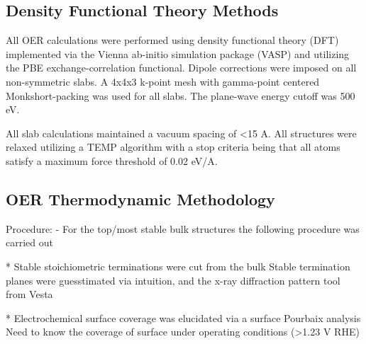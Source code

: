 \subsection{Density Functional Theory Methods}  %
%
All OER calculations were performed using density functional theory (DFT) implemented via the Vienna ab-initio simulation package (VASP) and utilizing the PBE exchange-correlation functional.
Dipole corrections were imposed on all non-symmetric slabs.
A 4x4x3 k-point mesh with gamma-point centered Monkshort-packing was used for all slabs.
The plane-wave energy cutoff was 500 eV.


All slab calculations maintained a vacuum spacing of <15 A.
All structures were relaxed utilizing a TEMP algorithm with a stop criteria being that all atoms satisfy a maximum force threshold of 0.02 eV/A.



\subsection{OER Thermodynamic Methodology}  %
%
Procedure:
- For the top/most stable bulk structures the following procedure was carried out

* Stable stoichiometric terminations were cut from the bulk Stable termination planes were guesstimated via intuition, and the x-ray diffraction pattern tool from Vesta

* Electrochemical surface coverage was elucidated via a surface Pourbaix analysis Need to know the coverage of surface under operating conditions (>1.23 V RHE)

